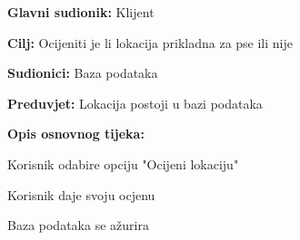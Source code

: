 					\noindent {}
					\begin{packed_item}
	
						\item \textbf{Glavni sudionik: }Klijent
						\item  \textbf{Cilj:} Ocijeniti je li lokacija prikladna za pse ili nije
						\item  \textbf{Sudionici:} Baza podataka
						\item  \textbf{Preduvjet:} Lokacija postoji u bazi podataka
						\item  \textbf{Opis osnovnog tijeka:}
						
						\item[] \begin{packed_enum}
	
							\item Korisnik odabire opciju "Ocijeni lokaciju"
							\item Korisnik daje svoju ocjenu
							\item Baza podataka se ažurira

						\end{packed_enum}
						
					\end{packed_item}
					
